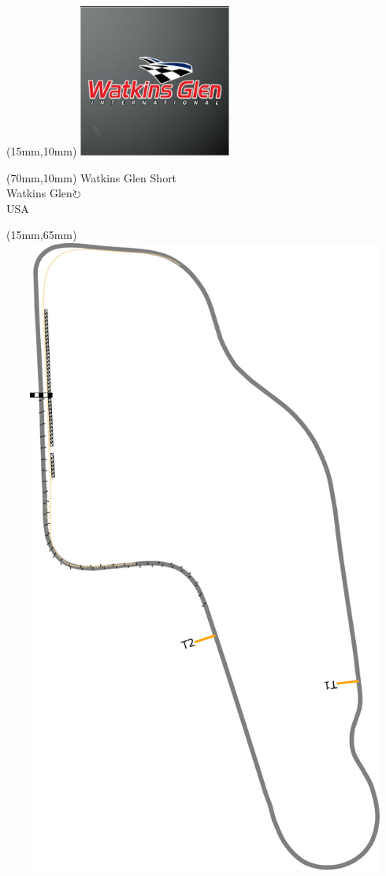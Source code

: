 \null\newpage
\begin{textblock*}{50mm}(15mm,10mm)%
\includegraphics[width=50mm]{LG/2015-05-20_00097.png}
\end{textblock*}
\begin{textblock*}{130mm}(70mm,10mm)%
{\fontsize{20}{20}\selectfont Watkins Glen Short\\}
{\fontsize{16}{16}\selectfont Watkins Glen\hfill \Large$\circlearrowright$\\}
{\fontsize{12}{12}\selectfont USA\\}
\end{textblock*}
\begin{textblock*}{185mm}(15mm,65mm)%
\centering
\mbox{\includegraphics[width=185mm,height=210mm,keepaspectratio]{PT/WAGLSH.pdf}}
\end{textblock*}
